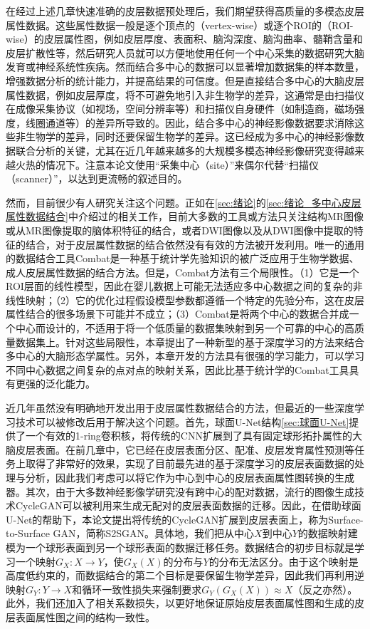 在经过上述几章快速准确的皮层数据预处理后，我们期望获得高质量的多模态皮层属性数据。这些属性数据一般是逐个顶点的（vertex-wise）或逐个ROI的（ROI-wise）的皮层属性图，例如皮层厚度、表面积、脑沟深度、脑沟曲率、髓鞘含量和皮层扩散性等，然后研究人员就可以方便地使用任何一个中心采集的数据研究大脑发育或神经系统性疾病。然而结合多中心的数据可以显著增加数据集的样本数量，增强数据分析的统计能力，并提高结果的可信度。但是直接结合多中心的大脑皮层属性数据，例如皮层厚度，将不可避免地引入非生物学的差异，这通常是由扫描仪在成像采集协议（如视场，空间分辨率等）和扫描仪自身硬件（如制造商，磁场强度，线圈通道等）的差异所导致的。因此，结合多中心的神经影像数据要求消除这些非生物学的差异，同时还要保留生物学的差异。这已经成为多中心的神经影像数据联合分析的关键，尤其在近几年越来越多的大规模多模态神经影像研究变得越来越火热的情况下。注意本论文使用“采集中心（site）”来偶尔代替“扫描仪（scanner）”，以达到更流畅的叙述目的。

然而，目前很少有人研究关注这个问题。正如在\ref{sec:绪论}的\ref{sec:绪论_多中心皮层属性数据结合}中介绍过的相关工作，目前大多数的工具或方法只关注结构MR图像或从MR图像提取的脑体积特征的结合\cite{pomponio2020harmonization}，或者DWI图像以及从DWI图像中提取的特征的结合\cite{karayumak2019retrospective}，对于皮层属性数据的结合依然没有有效的方法被开发利用。唯一的通用的数据结合工具Combat\cite{fortin2018harmonization}是一种基于统计学先验知识的被广泛应用于生物学数据、成人皮层属性数据的结合方法。但是，Combat方法有三个局限性。（1）它是一个ROI层面的线性模型，因此在婴儿数据上可能无法适应多中心数据之间的复杂的非线性映射；（2）它的优化过程假设模型参数都遵循一个特定的先验分布，这在皮层属性结合的很多场景下可能并不成立；（3）Combat是将两个中心的数据合并成一个中心而设计的，不适用于将一个低质量的数据集映射到另一个可靠的中心的高质量数据集上。针对这些局限性，本章提出了一种新型的基于深度学习的方法来结合多中心的大脑形态学属性。另外，本章开发的方法具有很强的学习能力，可以学习不同中心数据之间复杂的点对点的映射关系，因此比基于统计学的Combat工具具有更强的泛化能力。

近几年虽然没有明确地开发出用于皮层属性数据结合的方法，但最近的一些深度学习技术\cite{zhao2019spherical_ipmi,zhu2017unpaired}可以被修改后用于解决这个问题。首先，球面U-Net结构\ref{sec:球面U-Net}提供了一个有效的1-ring卷积核，将传统的CNN扩展到了具有固定球形拓扑属性的大脑皮层表面。在前几章中，它已经在皮层表面分区、配准、皮层发育属性预测等任务上取得了非常好的效果，实现了目前最先进的基于深度学习的皮层表面数据的处理与分析，因此我们考虑可以将它作为中心到中心的皮层表面属性图转换的生成器。其次，由于大多数神经影像学研究没有跨中心的配对数据，流行的图像生成技术CycleGAN\cite{zhu2017unpaired}可以被利用来生成无配对的皮层表面数据的迁移。因此，在借助球面U-Net的帮助下，本论文提出将传统的CycleGAN扩展到皮层表面上，称为Surface-to-Surface GAN，简称S2SGAN。具体地，我们把从中心$X$到中心$Y$的数据映射建模为一个球形表面到另一个球形表面的数据迁移任务。数据结合的初步目标就是学习一个映射$G_X:X\rightarrow Y$，使$G_X(X)$的分布与$Y$的分布无法区分。由于这个映射是高度低约束的，而数据结合的第二个目标是要保留生物学差异，因此我们再利用逆映射$G_Y: Y\rightarrow X$和循环一致性损失来强制要求$G_Y(G_X(X))\approx X$（反之亦然）。此外，我们还加入了相关系数损失，以更好地保证原始皮层表面属性图和生成的皮层表面属性图之间的结构一致性。	
	

